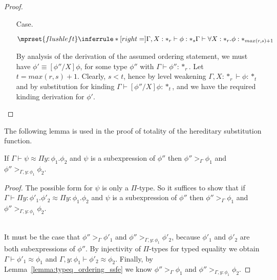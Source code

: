 \begin{proof}
\begin{itemize}
\item[Case.]\ \\
  \begin{center}
    \begin{math}
      $$\mprset{flushleft}
      \inferrule* [right=] {
        \Gamma,X : *_r \vdash \phi : *_s
      }{\Gamma \vdash \forall X:*_r.\phi : *_{max(r,s)+1}}
    \end{math}
  \end{center}
  By analysis of the derivation of the assumed ordering statement, we must have 
  $\phi' \equiv [\phi''/X]\phi$, for some type $\phi''$ with 
  $\Gamma \vdash \phi'':*_r$.  Let $t = max(r,s) + 1$. Clearly, 
  $s < t$, hence by level weakening $\Gamma,X:*_r \vdash \phi:*_t$ and by substitution 
  for kinding $\Gamma \vdash [\phi''/X]\phi:*_t$, and we have the required kinding 
  derivation for $\phi'$.  
\end{itemize}
\end{proof}
The following lemma is used in the proof of totality of the hereditary substitution function.
\begin{lemma}
  \label{lemma:A_prop_ssfe}
  If $\Gamma \vdash \psi \approx \Pi y:\phi_1.\phi_2$ and $\psi$ is a subexpression of $\phi''$ then
  $\phi'' >_\Gamma \phi_1$ and $\phi'' >_{\Gamma,y:\phi_1} \phi_2$.
\end{lemma}
\begin{proof}
  The possible form for $\psi$ is only a $\Pi$-type.  So it suffices to show that
  if $\Gamma \vdash \Pi y:\phi'_1.\phi'_2 \approx \Pi y:\phi_1.\phi_2$ and $\psi$ is
  a subexpression of $\phi''$ then $\phi'' >_\Gamma \phi_1$ and $\phi'' >_{\Gamma,y:\phi_1} \phi_2$.

  \ \\
  It must be the case that $\phi'' >_\Gamma \phi'_1$ and $\phi'' >_{\Gamma,y:\phi_1} \phi'_2$, because
  $\phi'_1$ and $\phi'_2$ are both subexpressions of $\phi''$.  By injectivity of $\Pi$-types
  for typed equality we obtain $\Gamma \vdash \phi'_1 \approx \phi_1$ and $\Gamma,y:\phi_1 \vdash \phi'_2 \approx \phi_2$.
  Finally, by Lemma~\ref{lemma:typeq_ordering_ssfe} we know $\phi'' >_\Gamma \phi_1$ and $\phi'' >_{\Gamma,y:\phi_1} \phi_2$.
\end{proof}

